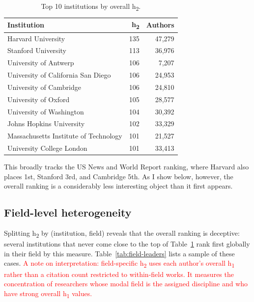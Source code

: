 \begin{table}[h]
	\centering
	\caption{Top 10 institutions by overall h\textsubscript{2}.}
	\label{tab:overall-h2}
	\begin{tabular}{@{}lrr@{}}
	\toprule
	Institution & h\textsubscript{2} & Authors \\
	\midrule
	Harvard University & 135 & 47,279 \\
	Stanford University & 113 & 36,976 \\
	University of Antwerp & 106 & 7,207 \\
	University of California San Diego & 106 & 24,953 \\
	University of Cambridge & 106 & 24,810 \\
	University of Oxford & 105 & 28,577 \\
	University of Washington & 104 & 30,392 \\
	Johns Hopkins University & 102 & 33,329 \\
	Massachusetts Institute of Technology & 101 & 21,527 \\
	University College London & 101 & 33,413 \\
	\bottomrule
	\end{tabular}
\end{table}

This broadly tracks the US News and World Report ranking, where Harvard also places 1st, Stanford 3rd, and Cambridge 5th. As I show below, however, the overall ranking is a considerably less interesting object than it first appears.

\subsection{Field-level heterogeneity}
\label{subsec:field-level}
Splitting h\textsubscript{2} by (institution, field) reveals that the overall ranking is deceptive: several institutions that never come close to the top of Table~\ref{tab:overall-h2} rank first globally in their field by this measure. Table~\ref{tab:field-leaders} lists a sample of these cases. \textcolor{red}{A note on interpretation: field-specific h\textsubscript{2} uses each author's overall h\textsubscript{1} rather than a citation count restricted to within-field works. It measures the concentration of researchers whose modal field is the assigned discipline and who have strong overall h\textsubscript{1} values.}

